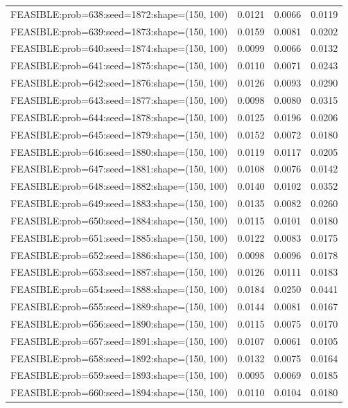 \begin{longtable}{lccc}
FEASIBLE:prob=638:seed=1872:shape=(150, 100) &   0.0121 & 0.0066 & 0.0119 \\
FEASIBLE:prob=639:seed=1873:shape=(150, 100) &   0.0159 & 0.0081 & 0.0202 \\
FEASIBLE:prob=640:seed=1874:shape=(150, 100) &   0.0099 & 0.0066 & 0.0132 \\
FEASIBLE:prob=641:seed=1875:shape=(150, 100) &   0.0110 & 0.0071 & 0.0243 \\
FEASIBLE:prob=642:seed=1876:shape=(150, 100) &   0.0126 & 0.0093 & 0.0290 \\
FEASIBLE:prob=643:seed=1877:shape=(150, 100) &   0.0098 & 0.0080 & 0.0315 \\
FEASIBLE:prob=644:seed=1878:shape=(150, 100) &   0.0125 & 0.0196 & 0.0206 \\
FEASIBLE:prob=645:seed=1879:shape=(150, 100) &   0.0152 & 0.0072 & 0.0180 \\
FEASIBLE:prob=646:seed=1880:shape=(150, 100) &   0.0119 & 0.0117 & 0.0205 \\
FEASIBLE:prob=647:seed=1881:shape=(150, 100) &   0.0108 & 0.0076 & 0.0142 \\
FEASIBLE:prob=648:seed=1882:shape=(150, 100) &   0.0140 & 0.0102 & 0.0352 \\
FEASIBLE:prob=649:seed=1883:shape=(150, 100) &   0.0135 & 0.0082 & 0.0260 \\
FEASIBLE:prob=650:seed=1884:shape=(150, 100) &   0.0115 & 0.0101 & 0.0180 \\
FEASIBLE:prob=651:seed=1885:shape=(150, 100) &   0.0122 & 0.0083 & 0.0175 \\
FEASIBLE:prob=652:seed=1886:shape=(150, 100) &   0.0098 & 0.0096 & 0.0178 \\
FEASIBLE:prob=653:seed=1887:shape=(150, 100) &   0.0126 & 0.0111 & 0.0183 \\
FEASIBLE:prob=654:seed=1888:shape=(150, 100) &   0.0184 & 0.0250 & 0.0441 \\
FEASIBLE:prob=655:seed=1889:shape=(150, 100) &   0.0144 & 0.0081 & 0.0167 \\
FEASIBLE:prob=656:seed=1890:shape=(150, 100) &   0.0115 & 0.0075 & 0.0170 \\
FEASIBLE:prob=657:seed=1891:shape=(150, 100) &   0.0107 & 0.0061 & 0.0105 \\
FEASIBLE:prob=658:seed=1892:shape=(150, 100) &   0.0132 & 0.0075 & 0.0164 \\
FEASIBLE:prob=659:seed=1893:shape=(150, 100) &   0.0095 & 0.0069 & 0.0185 \\
FEASIBLE:prob=660:seed=1894:shape=(150, 100) &   0.0110 & 0.0104 & 0.0180 \\

\end{longtable}
